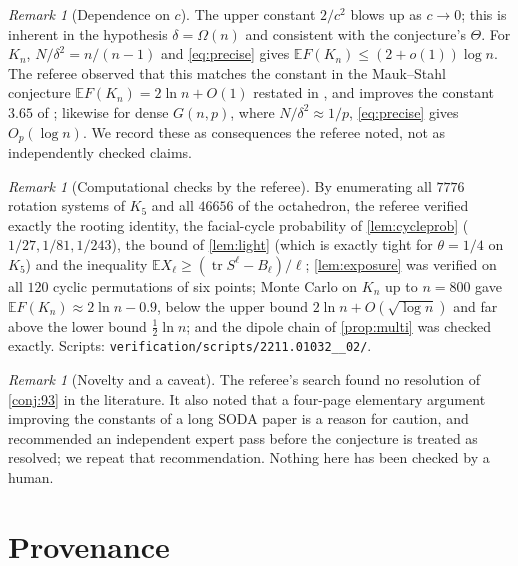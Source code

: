 \documentclass[11pt,a4paper]{article}
\theoremstyle{plain}
\theoremstyle{definition}
\theoremstyle{remark}
\newtheorem{remark}[theorem]{Remark}
\newcommand{\E}{\mathbb E}
\DeclareMathOperator{\tr}{tr}
\begin{document}
\begin{remark}[Dependence on $c$]
The upper constant $2/c^2$ blows up as $c\to0$; this is inherent in the hypothesis $\delta=\Omega(n)$ and consistent with the conjecture's $\Theta$. For $K_n$, $N/\delta^2=n/(n-1)$ and \eqref{eq:precise} gives $\E F(K_n)\le(2+o(1))\log n$. The referee observed that this matches the constant in the Mauk--Stahl conjecture $\E F(K_n)=2\ln n+O(1)$ restated in \cite[Section~9]{CHMMS}, and improves the constant $3.65$ of \cite[Theorem~1.8]{CHMMS}; likewise for dense $G(n,p)$, where $N/\delta^2\approx1/p$, \eqref{eq:precise} gives $O_p(\log n)$. We record these as consequences the referee noted, not as independently checked claims.
\end{remark}

\begin{remark}[Computational checks by the referee]
By enumerating all $7776$ rotation systems of $K_5$ and all $46656$ of the octahedron, the referee verified exactly the rooting identity, the facial-cycle probability of \cref{lem:cycleprob} ($1/27,1/81,1/243$), the bound of \cref{lem:light} (which is exactly tight for $\theta=1/4$ on $K_5$) and the inequality $\E X_\ell\ge(\tr S^\ell-B_\ell)/\ell$; \cref{lem:exposure} was verified on all $120$ cyclic permutations of six points; Monte Carlo on $K_n$ up to $n=800$ gave $\E F(K_n)\approx2\ln n-0.9$, below the upper bound $2\ln n+O(\sqrt{\log n})$ and far above the lower bound $\tfrac12\ln n$; and the dipole chain of \cref{prop:multi} was checked exactly. Scripts: \texttt{verification/scripts/2211.01032\_\_02/}.
\end{remark}

\begin{remark}[Novelty and a caveat]
The referee's search found no resolution of \cref{conj:93} in the literature. It also noted that a four-page elementary argument improving the constants of a long SODA paper is a reason for caution, and recommended an independent expert pass before the conjecture is treated as resolved; we repeat that recommendation. Nothing here has been checked by a human.
\end{remark}

\section{Provenance}\label{sec:provenance}
\end{document}
